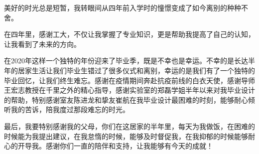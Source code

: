 \begin{acknowledgements}
美好的时光总是短暂，我转眼间从四年前入学时的憧憬变成了如今离别的种种不舍。

在四年里，感谢工大，不仅让我掌握了专业知识，更是帮助我提高了自己的认知，让我看到了未来的方向。

在2020年这样一个独特的年份迎来了毕业季，既是不幸也是幸运。不幸的是长达半年的居家生活让我们毕业生错过了很多仪式和离别，幸运的是我们有了一个独特的毕业回忆，让我们终生难忘。感谢在疫情期间奔赴抗疫前线的白衣天使，感谢导师王宏志教授在千里之外的精心指导，感谢实验室的郑磊学姐半年以来对我毕业设计的帮助，特别感谢室友陈进龙和挚友崔航在我毕业设计最困难的时刻，能够耐心倾听我的苦诉，陪我度过那段难忘的时光。

最后，我要特别感谢我的父母，你们在这居家的半年里，每天为我做饭，在困难的时候能为我提出建议，在我怠惰的时候，能够及时督促我，在我抑郁的时候能够耐心的开导我。感谢你们一直的陪伴和支持，让我能够有今天的成就！

\end{acknowledgements}

